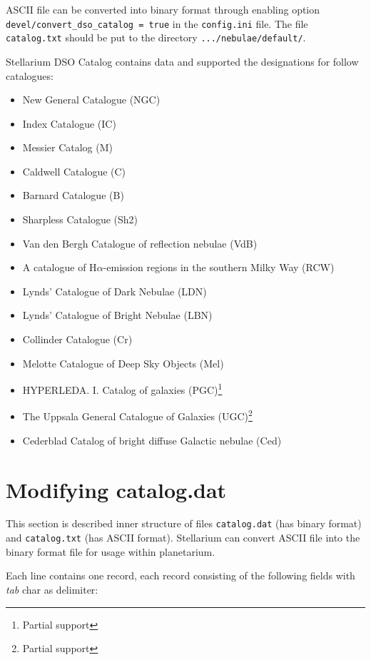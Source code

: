 ASCII file can be converted into binary format through enabling option
\texttt{devel/convert\_dso\_catalog\ =\ true} in the \texttt{config.ini}
file. The file \texttt{catalog.txt} should be put to the directory
\texttt{.../nebulae/default/}.

Stellarium DSO Catalog contains data and supported the designations for
follow catalogues:

\begin{itemize}
\item
  New General Catalogue (NGC)
\item
  Index Catalogue (IC)
\item
  Messier Catalog (M)
\item
  Caldwell Catalogue (C)
\item
  Barnard Catalogue (B)
\item
  Sharpless Catalogue (Sh2)
\item
  Van den Bergh Catalogue of reflection nebulae (VdB)
\item
  A catalogue of H$\alpha$-emission regions in the southern Milky Way (RCW)
\item
  Lynds' Catalogue of Dark Nebulae (LDN)
\item
  Lynds' Catalogue of Bright Nebulae (LBN)
\item
  Collinder Catalogue (Cr)
\item
  Melotte Catalogue of Deep Sky Objects (Mel)
\item
  HYPERLEDA. I. Catalog of galaxies (PGC)\footnote{Partial support}
\item
  The Uppsala General Catalogue of Galaxies (UGC)\footnote{Partial
    support}
\item
  Cederblad Catalog of bright diffuse Galactic nebulae (Ced)
\end{itemize}

\section{Modifying catalog.dat}\label{modifying-catalog.dat}

This section is described inner structure of files \texttt{catalog.dat}
(has binary format) and \texttt{catalog.txt} (has ASCII format).
Stellarium can convert ASCII file into the binary format file for usage
within planetarium.

Each line contains one record, each record consisting of the following
fields with \emph{tab} char as delimiter:

